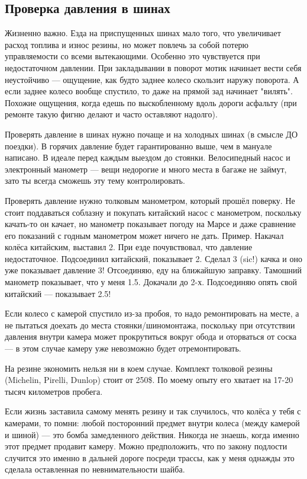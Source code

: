 \documentclass[12pt,a4paper]{article}
\begin{document}
\subsection{Проверка давления в шинах}

Жизненно важно. Езда на приспущенных шинах мало того, что увеличивает
расход топлива и износ резины, но может повлечь за собой потерю управляемости
со всеми вытекающими. Особенно это чувствуется при недостаточном давлении.
При закладывании в поворот мотик начинает вести себя неустойчиво --- ощущение,
как будто заднее колесо скользит наружу поворота. А если заднее колесо вообще
спустило, то даже на прямой зад начинает "вилять". Похожие ощущения, когда
едешь по выскобленному вдоль дороги асфальту (при ремонте такую фигню делают
и часто оставляют надолго).

Проверять давление в шинах нужно почаще и на холодных шинах
(в смысле ДО поездки). В горячих давление будет гарантированно выше, чем в
мануале написано. В идеале перед каждым выездом до стоянки. Велосипедный
насос и электронный манометр --- вещи недорогие и много места в багаже не
займут, зато ты всегда сможешь эту тему контролировать.

Проверять давление нужно толковым манометром, который прошёл поверку. Не стоит
поддаваться соблазну и покупать китайский насос с манометром, поскольку
качать-то он качает, но манометр показывает погоду на Марсе и даже сравнение
его показаний с годным манометром может ничего не дать. Пример. Накачал колёса
китайским, выставил 2. При езде почувствовал, что давление недостаточное.
Подсоединил китайский, показывает 2. Сделал 3 (sic!) качка и оно уже показывает
давление 3! Отсоединяю, еду на ближайшую заправку. Тамошний манометр показывает,
что у меня 1.5. Докачали до 2-х. Подсоединяю опять свой китайский ---
показывает 2.5!

Если колесо с камерой спустило из-за пробоя, то надо ремонтировать на месте,
а не пытаться доехать до места стоянки/шиномонтажа, поскольку при отсутствии
давления внутри камера может прокрутиться вокруг обода и оторваться от соска ---
в этом случае камеру уже невозможно будет отремонтировать.

На резине экономить нельзя ни в коем случае. Комплект толковой резины
(Michelin, Pirelli, Dunlop) стоит от 250\$. По моему опыту его хватает
на 17-20 тысяч километров пробега.

Если жизнь заставила самому менять резину и так случилось, что колёса у тебя
с камерами, то помни: любой посторонний предмет внутри колеса (между камерой
и шиной) --- это бомба замедленного действия. Никогда не знаешь, когда именно
этот предмет продавит камеру. Можно предположить, что по закону
подлости случится это именно в дальней дороге посреди трассы, как
у меня однажды это сделала оставленная по невнимательности шайба.
\end{document}
